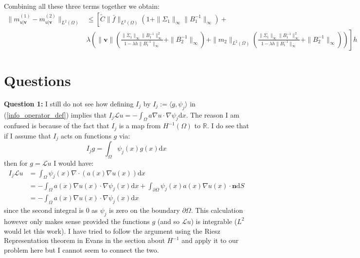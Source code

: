 \documentclass{article}
\theoremstyle{definition}
\theoremstyle{remark}
\begin{document}
Combining all these three terms together we obtain:
\begin{align*}
    \|m^{(1)}_{u|\mathbf{v}}-m^{(2)}_{u|\mathbf{v}}\|_{L^{2}(\Omega)}&\leq\left[\tilde{C}\|\bar{f}\|_{L^{2}(\Omega)}(1+\|\Sigma_{1}\|_{\infty}\|B_{1}^{-1}\|_{\infty})+\right. \\
    &\left.\lambda\left(\|\mathbf{v}\|\left(\frac{\|\Sigma_{1}\|_{\infty}\|B_{1}^{-1}\|_{\infty}^{2}}{1-\lambda h \|B_{1}^{-1}\|_{\infty}}+\|B_{2}^{-1}\|_{\infty}\right)+\|m_{2}\|_{L^{2}(\Omega)}\left(\frac{\|\Sigma_{1}\|_{\infty}\|B_{1}^{-1}\|_{\infty}^{2}}{1-\lambda h \|B_{1}^{-1}\|_{\infty}}+\|B_{2}^{-1}\|_{\infty}\right)\right)\right]h
\end{align*}




\clearpage
\section{Questions}

\noindent \textbf{Question 1:} I still do not see how defining $I_j$ by $I_j:=\langle g, \psi_j \rangle$ in (\ref{info_operator_def}) implies that $I_{j}\mathcal{L}u=-\int_{\Omega}a\nabla u \cdot \nabla\psi_{j}\mathrm{d}x$. The reason I am confused is because of the fact that $I_j$ is a map from $H^{-1}(\Omega)$ to $\mathbb{R}$. I do see that if I assume that $I_{j}$ acts on functions $g$ via:
\begin{equation*}
    I_{j}g=\int_{\Omega}\psi_{j}(x)g(x)\mathrm{d}x
\end{equation*}
then for $g=\mathcal{L}u$ I would have:
\begin{align*}
    I_{j}\mathcal{L}u&=\int_{\Omega}\psi_{j}(x)\nabla\cdot(a(x)\nabla u(x))\mathrm{d}x \\
    &=-\int_{\Omega}a(x)\nabla u(x)\cdot\nabla\psi_{j}(x)\mathrm{d}x + \int_{\partial\Omega}\psi_{j}(x)a(x)\nabla u(x)\cdot\mathbf{n}\mathrm{d}S \\
    &=-\int_{\Omega}a(x)\nabla u(x)\cdot\nabla\psi_{j}(x)\mathrm{d}x
\end{align*}
since the second integral is $0$ as $\psi_j$ is zero on the boundary $\partial\Omega$. This calculation however only makes sense provided the functions $g$ (and so $\mathcal{L}u$) is integrable ($L^2$ would let this work). I have tried to follow the argument using the Riesz Representation theorem in Evans in the section about $H^{-1}$ and apply it to our problem here but I cannot seem to connect the two. \\
\end{document}

